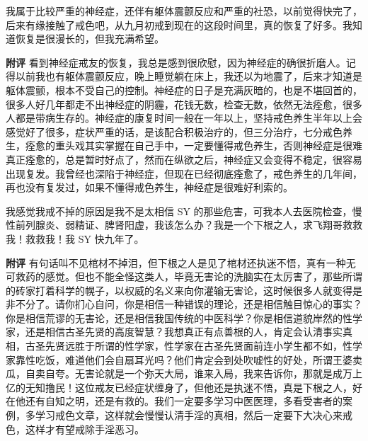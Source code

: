 \begin{case}
    我属于比较严重的神经症，还伴有躯体震颤反应和严重的社恐，以前觉得快完了，后来有缘接触了戒色吧，从九月初戒到现在的这段时间里，真的恢复了好多。我知道恢复是很漫长的，但我充满希望。

    \textbf{附评} 看到神经症戒友的恢复，我总是感到很欣慰，因为神经症的确很折磨人。记得以前我也有躯体震颤反应，晚上睡觉躺在床上，我还以为地震了，后来才知道是躯体震颤，根本不受自己的控制。神经症的日子是充满灰暗的，也是不堪回首的，很多人好几年都走不出神经症的阴霾，花钱无数，检查无数，依然无法痊愈，很多人都是带病生存的。神经症的康复时间一般在一年以上，坚持戒色养生半年以上会感觉好了很多，症状严重的话，是该配合积极治疗的，但三分治疗，七分戒色养生，痊愈的重头戏其实掌握在自己手中，一定要懂得戒色养生，否则神经症是很难真正痊愈的，总是暂时好点了，然而在纵欲之后，神经症又会变得不稳定，很容易出现复发。我曾经也深陷于神经症，但现在已经彻底痊愈了，戒色养生的几年间，再也没有复发过，如果不懂得戒色养生，神经症是很难好利索的。
\end{case}

\begin{case}
    我感觉我戒不掉的原因是我不是太相信 SY 的那些危害，可我本人去医院检查，慢性前列腺炎、弱精证、脾肾阳虚，我该怎么办？我是一个下根之人，求飞翔哥救救我！救救我！我 SY 快九年了。

    \textbf{附评} 有句话叫不见棺材不掉泪，但下根之人是见了棺材还执迷不悟，真有一种无可救药的感觉。但也不能全怪这类人，毕竟无害论的洗脑实在太厉害了，那些所谓的砖家打着科学的幌子，以权威的名义来向你灌输无害论，这时候很多人就变得是非不分了。请你扪心自问，你是相信一种错误的理论，还是相信触目惊心的事实？你是相信荒谬的无害论，还是相信我国传统的中医科学？你是相信道貌岸然的性学家，还是相信古圣先贤的高度智慧？我想真正有点善根的人，肯定会认清事实真相，古圣先贤远胜于所谓的性学家，性学家在古圣先贤面前连小学生都不如，性学家靠性吃饭，难道他们会自扇耳光吗？他们肯定会到处吹嘘性的好处，所谓王婆卖瓜，自卖自夸。无害论就是一个弥天大局，谁来入局，我来告诉你，那就是成万上亿的无知撸民！这位戒友已经症状缠身了，但他还是执迷不悟，真是下根之人，好在他还有自知之明，还是有救的。我们一定要多学习中医医理，多看受害者的案例，多学习戒色文章，这样就会慢慢认清手淫的真相，然后一定要下大决心来戒色，这样才有望戒除手淫恶习。
\end{case}

